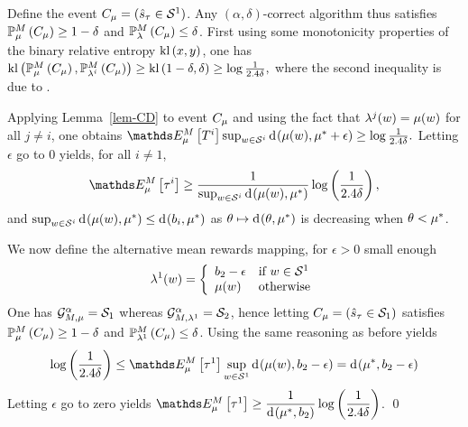 Define the event $C_\mu = (\hat{s}_\tau \in \mathcal{S}^{1})$. Any
$(\alpha,\delta)$-correct algorithm thus satisfies
$\mathbb{P}_{\mu}^M\left(  C_\mu  \right) \geq 1 - \delta$
and $\mathbb{P}_{\lambda}^M\left(  C_\mu  \right) \leq \delta$. 
First using some monotonicity properties of the binary
relative entropy $\operatorname{kl}\left( x, y \right)$, one has 
$
\operatorname{kl}\left( \mathbb{P}_{\mu}^M\left( C_\mu \right), \mathbb{P}_{\lambda^i}^M\left( C_\mu \right) \right)
	\ge \operatorname{kl}\left( 1-\delta, \delta \right)
    \ge \log\frac{1}{2.4\delta},
$
where the second inequality is due to \cite{JMLR15}.

Applying Lemma~\ref{lem-CD} to event $C_\mu$ and using the fact that
$\lambda^j(w)=\mu(w)$ for all
$j\neq i$, one obtains
%
$
 \ETrueModel{T^i}\sup_{\arm \in
\ArmGrp{i}} \ArmKL{\ArmMean(\arm)}{\ArmMean^*+\epsilon} \geq \log\frac{1}{2.4\delta}.
$
%
Letting $\epsilon$ go to $0$ yields, for all $i\neq 1$,
%
\begin{align*}
\ETrueModel{\tau^i} \ge \frac{1}{\sup_{\arm \in \ArmGrp{i}}
        \ArmKL{\ArmMean(\arm)}{\ArmMean^*}}
        \log\left(\frac{1}{2.4\delta}\right),
\end{align*}
%
and $\sup_{w \in \mathcal{S}^{i}}
\operatorname{d}\hspace{-.1em}\left( \mu(w), \mu^* \right) \leq \operatorname{d}\hspace{-.1em}\left( b_i, \mu^* \right)$ as $\theta \mapsto \operatorname{d}\hspace{-.1em}\left( \theta, \mu^* \right)$ is
decreasing when $\theta < \mu^*$.

We now define the alternative mean rewards mapping, for $\epsilon>0$ small
enough
\begin{align}
\lambda^1(w) = \left\{
\begin{array}{ll}
b_2 - \epsilon & \text{if } w \in \mathcal{S}^{1} \\
\mu(w) & \text{otherwise}
\end{array}
\right.
\end{align}
One has $\mathcal{G}_{M,\mu}^{\alpha}=\mathcal{S}_{1}$ whereas
$\mathcal{G}_{M,\lambda^1}^{\alpha}=\mathcal{S}_{2}$, hence
letting $C_\mu = (\hat{s}_\tau \in \mathcal{S}_{1})$ satisfies
$\mathbb{P}_{\mu}^M\left( C_\mu \right) \geq 1-\delta$ and $\mathbb{P}_{\lambda^1}^M\left( C_\mu \right) \leq \delta$.
Using the same reasoning as before yields
\begin{align*}
\log\left(\frac{1}{2.4\delta}\right) \leq \ETrueModel{\tau^1} \sup_{\arm \in \ArmGrp{1}}
\ArmKL{\ArmMean(\arm)}{b_2-\epsilon}
= \ArmKL{\ArmMean^*}{b_2-\epsilon}
\end{align*}
Letting $\epsilon$ go to zero yields 
$\ETrueModel{\tau^1} \ge \displaystyle\frac{1}{\ArmKL{\ArmMean^*}{b_2}}\log\left(\frac{1}{2.4\delta}\right)$.
\qed

